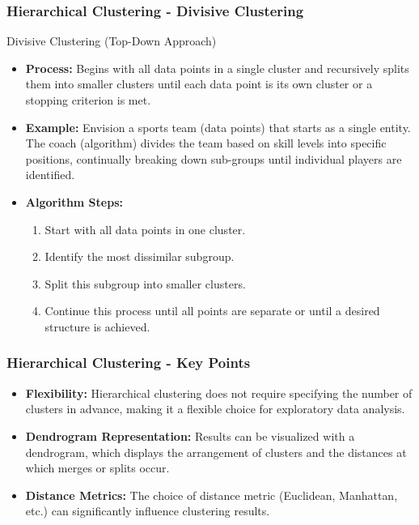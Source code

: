 \documentclass{beamer}
\begin{document}
\begin{frame}[fragile]
    \frametitle{Hierarchical Clustering - Divisive Clustering}
    \begin{block}{Divisive Clustering (Top-Down Approach)}
        \begin{itemize}
            \item \textbf{Process:} Begins with all data points in a single cluster and recursively splits them into smaller clusters until each data point is its own cluster or a stopping criterion is met.
            \item \textbf{Example:} Envision a sports team (data points) that starts as a single entity. The coach (algorithm) divides the team based on skill levels into specific positions, continually breaking down sub-groups until individual players are identified.
            \item \textbf{Algorithm Steps:}
                \begin{enumerate}
                    \item Start with all data points in one cluster.
                    \item Identify the most dissimilar subgroup.
                    \item Split this subgroup into smaller clusters.
                    \item Continue this process until all points are separate or until a desired structure is achieved.
                \end{enumerate}
        \end{itemize}
    \end{block}
\end{frame}

\begin{frame}[fragile]
    \frametitle{Hierarchical Clustering - Key Points}
    \begin{itemize}
        \item \textbf{Flexibility:} Hierarchical clustering does not require specifying the number of clusters in advance, making it a flexible choice for exploratory data analysis.
        \item \textbf{Dendrogram Representation:} Results can be visualized with a dendrogram, which displays the arrangement of clusters and the distances at which merges or splits occur.
        \item \textbf{Distance Metrics:} The choice of distance metric (Euclidean, Manhattan, etc.) can significantly influence clustering results.
    \end{itemize}
\end{frame}
\end{document}
